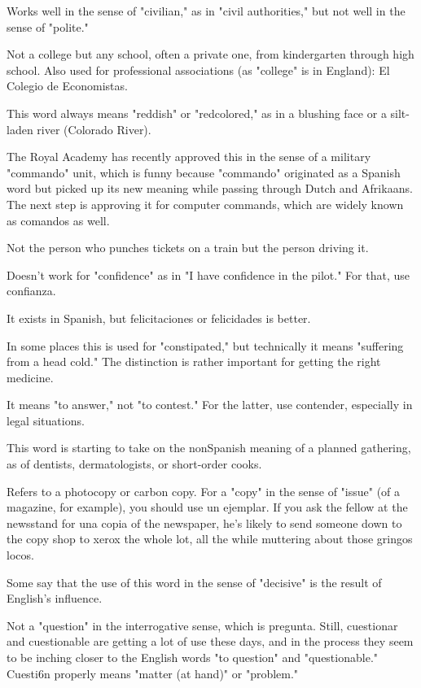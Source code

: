  Works well in the sense of "civilian," as in "civil authorities," but not well in the sense of "polite."

 Not a college but any school, often a private one,
from kindergarten through high school. Also used for professional associations (as "college" is in England): El Colegio de Economistas.

 This word always means "reddish" or "redcolored," as in a blushing face or a silt-laden river (Colorado River).

 The Royal Academy has recently approved this in
the sense of a military "commando" unit, which is funny because "commando" originated as a Spanish word but picked up its new meaning
while passing through Dutch and Afrikaans. The next step is approving it for computer commands, which are widely known as comandos
as well.

 Not the person who punches tickets on a train
but the person driving it.

 Doesn't work for "confidence" as in "I have
confidence in the pilot." For that, use confianza.

 It exists in Spanish, but felicitaciones
or felicidades is better.

 In some places this is used for "constipated,"
but technically it means "suffering from a head cold." The distinction
is rather important for getting the right medicine.

 It means "to answer," not "to contest." For the
latter, use contender, especially in legal situations.

 This word is starting to take on the nonSpanish meaning of a planned gathering, as of dentists, dermatologists, or short-order cooks.

 Refers to a photocopy or carbon copy. For a "copy" in
the sense of "issue" (of a magazine, for example), you should use un
ejemplar. If you ask the fellow at the newsstand for una copia of the
newspaper, he's likely to send someone down to the copy shop to
xerox the whole lot, all the while muttering about those gringos
locos.

 Some say that the use of this word in the sense of
"decisive" is the result of English's influence.

 Not a "question" in the interrogative sense,
which is pregunta. Still, cuestionar and cuestionable are getting a
lot of use these days, and in the process they seem to be inching closer
to the English words "to question" and "questionable." Cuesti6n properly means "matter (at hand)" or "problem."

